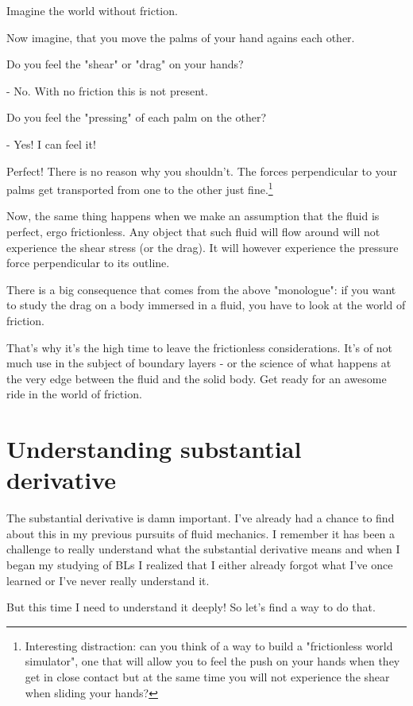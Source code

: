 \documentclass[12pt]{report}
\begin{document}
Imagine the world without friction.

Now imagine, that you move the palms of your hand agains each other.

Do you feel the "shear" or "drag" on your hands?

- No. With no friction this is not present.

Do you feel the "pressing" of each palm on the other?

- Yes! I can feel it!

Perfect! There is no reason why you shouldn't. The forces perpendicular to your palms get transported from one to the other just fine.\footnote{Interesting distraction: can you think of a way to build a "frictionless world simulator", one that will allow you to feel the push on your hands when they get in close contact but at the same time you will not experience the shear when sliding your hands?}

Now, the same thing happens when we make an assumption that the fluid is perfect, ergo frictionless. Any object that such fluid will flow around will not experience the shear stress (or the drag). It will however experience the pressure force perpendicular to its outline.

There is a big consequence that comes from the above "monologue": if you want to study the drag on a body immersed in a fluid, you have to look at the world of friction.

That's why it's the high time to leave the frictionless considerations. It's of not much use in the subject of boundary layers - or the science of what happens at the very edge between the fluid and the solid body. Get ready for an awesome ride in the world of friction.







\section{Understanding substantial derivative} \label{chap:deriv}

The substantial derivative is damn important. I've already had a chance to find about this in my previous pursuits of fluid mechanics. I remember it has been a challenge to really understand what the substantial derivative means and when I began my studying of BLs I realized that I either already forgot what I've once learned or I've never really understand it.

But this time I need to understand it deeply! So let's find a way to do that.
\end{document}
